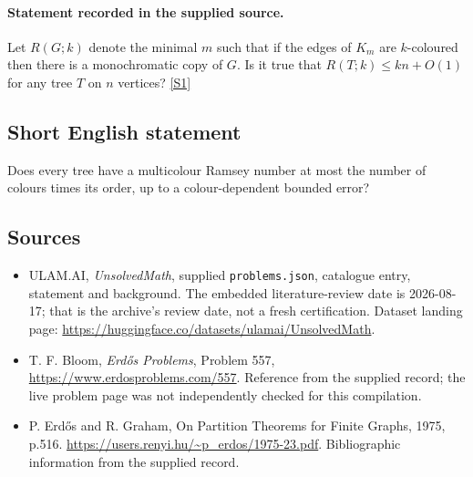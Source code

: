 \documentclass[11pt,a4paper]{article}
\newcommand{\sref}[2]{\hyperlink{source:#1:#2}{[S#2]}}
\begin{document}
\paragraph{Statement recorded in the supplied source.}
Let $R(G;k)$ denote the minimal $m$ such that if the edges of $K_m$ are $k$-coloured then there is a monochromatic copy of $G$. Is it true that $ R(T;k)\leq kn+O(1) $ for any tree $T$ on $n$ vertices? \sref{statement}{1}

\subsection{Short English statement}

Does every tree have a multicolour Ramsey number at most the number of colours times its order, up to a colour-dependent bounded error?

\subsection{Sources}

{\small

\begin{itemize}

\item[\hypertarget{source:statement:1}{S1}] ULAM.AI, \emph{UnsolvedMath}, supplied \texttt{problems.json}, catalogue entry, statement and background. The embedded literature-review date is 2026-08-17; that is the archive’s review date, not a fresh certification. Dataset landing page: \url{https://huggingface.co/datasets/ulamai/UnsolvedMath}.

\item[\hypertarget{source:statement:2}{S2}] T. F. Bloom, \emph{Erdős Problems}, Problem 557, \url{https://www.erdosproblems.com/557}. Reference from the supplied record; the live problem page was not independently checked for this compilation.

\item[\hypertarget{source:statement:3}{S3}] P. Erdős and R. Graham, On Partition Theorems for Finite Graphs, 1975, p.516. \url{https://users.renyi.hu/~p_erdos/1975-23.pdf}. Bibliographic information from the supplied record.

\end{itemize}

}

\label{end:statement}
\end{document}
